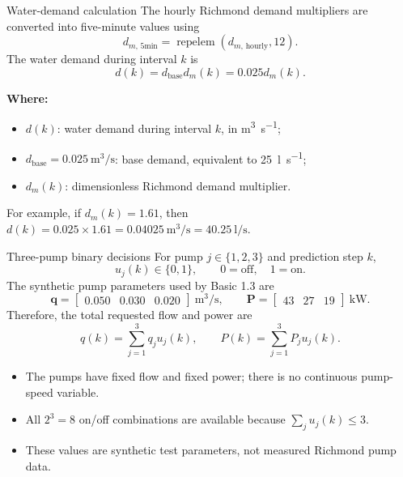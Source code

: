 \documentclass[t,12pt]{beamer}
\begin{document}
\begin{frame}{Water-demand calculation}
The hourly Richmond demand multipliers are converted into five-minute
values using
\[
  d_{m,\,5\mathrm{min}}=\operatorname{repelem}
  \!\left(d_{m,\,\mathrm{hourly}},12\right).
\]
The water demand during interval $k$ is
\[
  d(k)=d_{\mathrm{base}}d_m(k)=0.025d_m(k).
\]

\textbf{Where:}
\begin{itemize}
  \item $d(k)$: water demand during interval $k$, in \si{\metre\cubed\per\second};
  \item $d_{\mathrm{base}}=0.025\ \si{\metre\cubed\per\second}$:
        base demand, equivalent to \SI{25}{\litre\per\second};
  \item $d_m(k)$: dimensionless Richmond demand multiplier.
\end{itemize}

For example, if $d_m(k)=1.61$, then
$d(k)=0.025\times1.61=0.04025\ \si{\metre\cubed\per\second}
=\SI{40.25}{\litre\per\second}$.
\end{frame}

\begin{frame}{Three-pump binary decisions}
For pump $j\in\{1,2,3\}$ and prediction step $k$,
\[
  u_j(k)\in\{0,1\},
  \qquad 0=\text{off},\quad 1=\text{on}.
\]
The synthetic pump parameters used by Basic 1.3 are
\[
  \bm q=\begin{bmatrix}0.050&0.030&0.020\end{bmatrix}
  \ \si{\metre\cubed\per\second},
  \qquad
  \bm P=\begin{bmatrix}43&27&19\end{bmatrix}\ \si{\kilo\watt}.
\]
Therefore, the total requested flow and power are
\[
  q(k)=\sum_{j=1}^{3}q_j u_j(k),
  \qquad
  P(k)=\sum_{j=1}^{3}P_j u_j(k).
\]

\begin{itemize}
  \item The pumps have fixed flow and fixed power; there is no continuous
        pump-speed variable.
  \item All $2^3=8$ on/off combinations are available because
        $\sum_j u_j(k)\leq3$.
  \item These values are synthetic test parameters, not measured Richmond
        pump data.
\end{itemize}
\end{frame}
\end{document}
